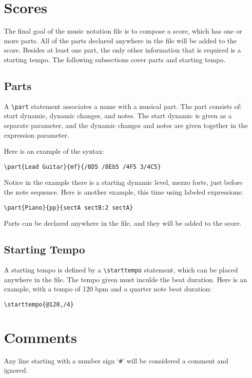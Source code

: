\documentclass{scrartcl}
\begin{document}
\section{Scores}
The final goal of the music notation file is to compose a score, which has one or more parts. All of the parts declared anywhere in the file will be added to the score. Besides at least one part, the only other information that is required is a starting tempo. The following subsections cover parts and starting tempo.

\subsection{Parts}
A \verb|\part| statement associates a name with a musical part. The part consists of: start dynamic, dynamic changes, and notes. The start dynamic is given as a separate parameter, and the dynamic changes and notes are given together in the expression parameter.

Here is an example of the syntax:

\begin{tabbing}
  \hspace{0.5in}\= \verb|\part{Lead Guitar}{mf}{/8D5 /8Eb5 /4F5 3/4C5}|
\end{tabbing}

Notice in the example there is a starting dynamic level, mezzo forte, just before the note sequence. Here is another example, this time using labeled expressions:

\begin{tabbing}
  \hspace{0.5in}\= \verb|\part{Piano}{pp}{sectA sectB:2 sectA}| \\
\end{tabbing}

Parts can be declared anywhere in the file, and they will be added to the score.

\subsection{Starting Tempo}
A starting tempo is defined by a \verb|\starttempo| statement, which can be placed anywhere in the file. The tempo given must inculde the beat duration. Here is an example, with a tempo of 120 bpm and a quarter note beat duration:

\begin{tabbing}
  \hspace{0.5in}\= \verb|\starttempo{@120,/4}|
\end{tabbing}

\section{Comments}
Any line starting with a number sign `\verb|#|' will be considered a comment and ignored.
\end{document}
